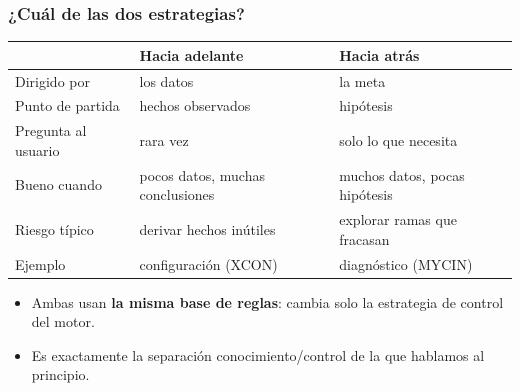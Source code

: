 \documentclass[aspectratio=169, 10pt]{beamer}
\begin{document}
\begin{frame}
\frametitle{¿Cuál de las dos estrategias?}
\begin{center}
\begin{tabular}{lll}
\toprule
 & \textbf{Hacia adelante} & \textbf{Hacia atr\'as} \\
\midrule
Dirigido por      & los datos            & la meta \\
Punto de partida  & hechos observados    & hip\'otesis \\
Pregunta al usuario & rara vez           & solo lo que necesita \\
Bueno cuando      & pocos datos, muchas conclusiones & muchos datos, pocas hip\'otesis \\
Riesgo t\'ipico   & derivar hechos in\'utiles & explorar ramas que fracasan \\
Ejemplo           & configuraci\'on (XCON) & diagn\'ostico (MYCIN) \\
\bottomrule
\end{tabular}
\end{center}
\vspace{0.8em}
\begin{itemize}
	\item Ambas usan \textbf{la misma base de reglas}: cambia solo la estrategia de control del motor.
	\item Es exactamente la separaci\'on conocimiento/control de la que hablamos al principio.
\end{itemize}
\end{frame}
\end{document}
